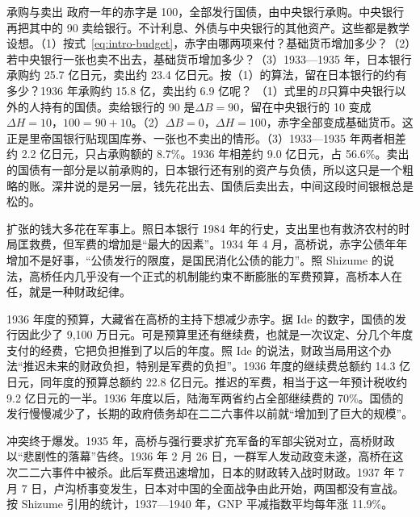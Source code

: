 \begin{example}{承购与卖出}\label{ex:alternatives-underwrite}
政府一年的赤字是 100，全部发行国债，由中央银行承购。中央银行再把其中的 90 卖给银行。不计利息、外债与中央银行的其他资产。这些都是教学设想。（1）按式~\eqref{eq:intro-budget}，赤字由哪两项来付？基础货币增加多少？（2）若中央银行一张也卖不出去，基础货币增加多少？（3）1933—1935 年，日本银行承购约 25.7 亿日元，卖出约 23.4 亿日元。按（1）的算法，留在日本银行的约有多少？1936 年承购约 15.8 亿，卖出约 6.9 亿呢？
\solution （1）式里的$B$只算中央银行以外的人持有的国债。卖给银行的 90 是$\Delta B=90$，留在中央银行的 10 变成$\Delta H=10$，$100=90+10$。（2）$\Delta B=0$，$\Delta H=100$，赤字全部变成基础货币。这正是里帝国银行贴现国库券、一张也不卖出的情形。（3）1933—1935 年两者相差约 2.2 亿日元，只占承购额的 8.7\%。1936 年相差约 9.0 亿日元，占 56.6\%。卖出的国债有一部分是以前承购的，日本银行还有别的资产与负债，所以这只是一个粗略的账。深井说的是另一层，钱先花出去、国债后卖出去，中间这段时间银根总是松的。
\end{example}

扩张的钱大多花在军事上。照日本银行 1984 年的行史，支出里也有救济农村的时局匡救费，但军费的增加是“最大的因素”\cite{boj1984}。1934 年 4 月，高桥说，赤字公债年年增加不是好事，“公债发行的限度，是国民消化公债的能力”\cite{boj1984}。照 Shizume 的说法，高桥任内几乎没有一个正式的机制能约束不断膨胀的军费预算，高桥本人在任，就是一种财政纪律\cite{shizume2009}。

1936 年度的预算，大藏省在高桥的主持下想减少赤字\cite{shizume2009}。据 Ide 的数字，国债的发行因此少了 9,100 万日元\cite{ide2003}。可是预算里还有继续费，也就是一次议定、分几个年度支付的经费，它把负担推到了以后的年度\cite{ide2003}。照 Ide 的说法，财政当局用这个办法“推迟未来的财政负担，特别是军费的负担”\cite{ide2003}。1936 年度的继续费总额约 14.3 亿日元，同年度的预算总额约 22.8 亿日元\cite{ide2003}。推迟的军费，相当于这一年预计税收约 9.2 亿日元的一半\cite{ide2003}。1936 年度以后，陆海军两省约占全部继续费的 70\%\cite{ide2003}。国债的发行慢慢减少了，长期的政府债务却在二二六事件以前就“增加到了巨大的规模”\cite{ide2003}。

冲突终于爆发。1935 年，高桥与强行要求扩充军备的军部尖锐对立，高桥财政以“悲剧性的落幕”告终\cite{boj1984}。1936 年 2 月 26 日，一群军人发动政变未遂，高桥在这次二二六事件中被杀\cite{ide2003,ndl2026}。此后军费迅速增加，日本的财政转入战时财政\cite{ide2003}。1937 年 7 月 7 日，卢沟桥事变发生，日本对中国的全面战争由此开始，两国都没有宣战\cite{ndl2026,shizume2009}。按 Shizume 引用的统计，1937—1940 年，GNP 平减指数平均每年涨 11.9\%\cite{shizume2009}。

